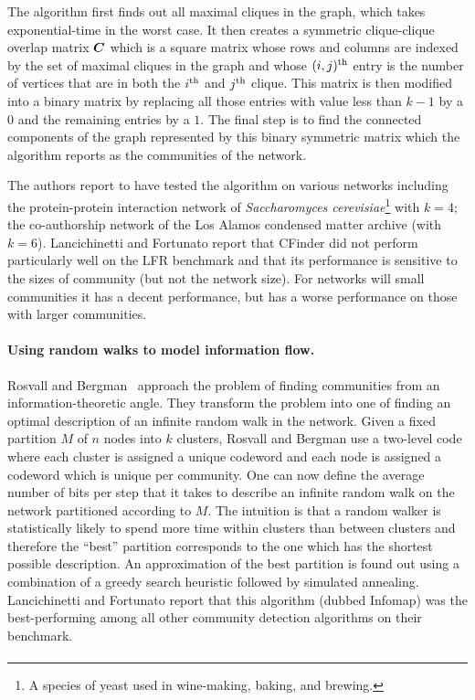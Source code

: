The algorithm first finds out all maximal cliques in the graph, which takes exponential-time
in the worst case. It then creates a symmetric clique-clique overlap matrix $\boldsymbol{C}$ which is a square matrix whose 
rows and columns are indexed by the set of maximal cliques in the graph and whose $(i, j)^{\textrm{th}}$ entry
is the number of vertices that are in both the $i^{\textrm{th}}$ and $j^{\textrm{th}}$ clique. This matrix is then modified into 
a binary matrix by replacing all those entries with value less than $k - 1$ by a $0$ and the remaining entries by 
a $1$. The final step is to find the connected components of the graph represented by this binary symmetric matrix
which the algorithm reports as the communities of the network. 

The authors report to have tested the algorithm on various networks including the protein-protein interaction 
network of \emph{Saccharomyces cerevisiae}\footnote{A species of yeast used in wine-making, baking, and brewing.} 
with $k = 4$; the co-authorship network of the Los Alamos condensed matter archive (with $k = 6$). 
Lancichinetti and Fortunato report that CFinder did not perform particularly well on the LFR benchmark and 
that its performance is sensitive to the sizes of community (but not the network size). For networks will 
small communities it has a decent performance, but has a worse performance on those with larger communities. 

\paragraph{Using random walks to model information flow.} Rosvall and Bergman~\cite{RB08} approach the 
problem of finding communities from an information-theoretic angle. They transform the problem 
into one of finding an optimal description of an infinite random walk in the network.  Given a fixed 
partition $M$ of $n$ nodes into $k$ clusters, Rosvall and Bergman use a two-level code where each 
cluster is assigned a unique codeword and each node is assigned a codeword which is unique per community.
One can now define the average number of bits per step that it 
takes to describe an infinite random walk on the network partitioned according to $M$. The intuition 
is that a random walker is statistically likely to spend more time within clusters than between clusters
and therefore the ``best'' partition corresponds to the one which has the shortest possible description.
An approximation of the best partition is found out using a combination of a greedy search heuristic followed by simulated 
annealing. Lancichinetti and Fortunato report that this algorithm (dubbed Infomap) was the best-performing 
among all other community detection algorithms on their benchmark.  

\paragraph{}
